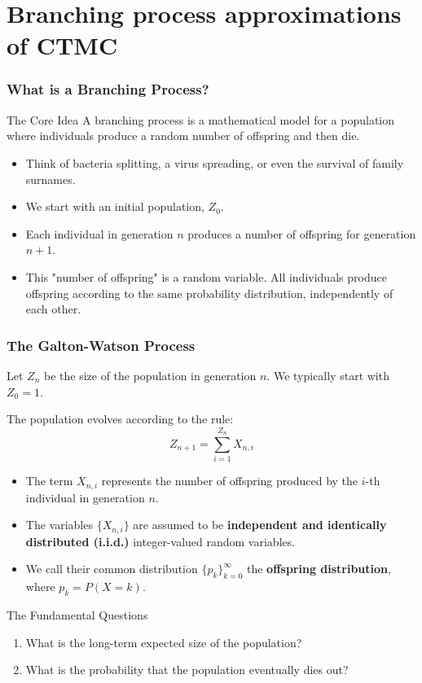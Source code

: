 \documentclass[aspectratio=169]{beamer}\usepackage[]{graphicx}\usepackage[]{xcolor}
\begin{document}
\section{Branching process approximations of CTMC}

\begin{frame}
    \frametitle{What is a Branching Process?}
    \begin{block}{The Core Idea}
        A branching process is a mathematical model for a population where individuals produce a random number of offspring and then die.
    \end{block}
    
    \begin{itemize}
        \item Think of bacteria splitting, a virus spreading, or even the survival of family surnames.
        \item We start with an initial population, $Z_0$.
        \item Each individual in generation $n$ produces a number of offspring for generation $n+1$.
        \item This "number of offspring" is a random variable. All individuals produce offspring according to the same probability distribution, independently of each other.
    \end{itemize}
\end{frame}

\begin{frame}
    \frametitle{The Galton-Watson Process}
    
    Let $Z_n$ be the size of the population in generation $n$. We typically start with $Z_0 = 1$.
    
    The population evolves according to the rule:
    $$ Z_{n+1} = \sum_{i=1}^{Z_n} X_{n,i} $$
    
    \begin{itemize}
        \item The term $X_{n,i}$ represents the number of offspring produced by the $i$-th individual in generation $n$.
        \item The variables $\{X_{n,i}\}$ are assumed to be \textbf{independent and identically distributed (i.i.d.)} integer-valued random variables.
        \item We call their common distribution $\{p_k\}_{k=0}^\infty$ the \textbf{offspring distribution}, where $p_k = P(X = k)$.
    \end{itemize}
    
    \begin{alertblock}{The Fundamental Questions}
    \begin{enumerate}
        \item What is the long-term expected size of the population?
        \item What is the probability that the population eventually dies out?
    \end{enumerate}
    \end{alertblock}
\end{frame}
\end{document}
